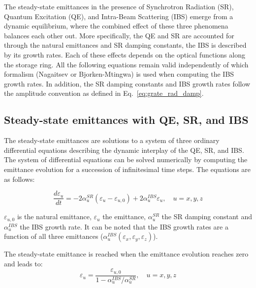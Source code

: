 The steady-state emittances in the presence of Synchrotron Radiation (SR), Quantum Excitation (QE), and Intra-Beam Scattering (IBS) emerge from a dynamic equilibrium, where the combined effect of these three phenomena balances each other out. More specifically, the QE and SR are accounted for through the natural emittances and SR damping constants, the IBS is described by its growth rates.
Each of these effects depends on the optical functions along the storage ring.
All the following equations remain valid independently of which formalism (Nagaitsev or Bjorken-Mtingwa) is used when computing the IBS growth rates. In addition, the SR damping constants and IBS growth rates follow the amplitude convention as defined in Eq.~\eqref{eq:grate_rad_damp}.

\subsection{Steady-state emittances with QE, SR, and IBS}

The steady-state emittances are solutions to a system of three ordinary differential equations describing the dynamic interplay of the QE, SR, and IBS. The system of differential equations can be solved numerically by computing the emittance evolution for a succession of infinitesimal time steps. The equations are as follows:


\begin{equation}
    \frac{d\varepsilon_u}{dt} = -2 \alpha^{SR}_u \left(\varepsilon_u - \varepsilon_{u,0} \right) + 2\alpha^{IBS}_u \varepsilon_{u}, \quad u = x,y,z
\label{eq:emit_evol}
\end{equation}

$\varepsilon_{u,0}$ is the natural emittance, $\varepsilon_u$ the emittance, $\alpha^{SR}_u$ the SR damping constant and $\alpha^{IBS}_u$ the IBS growth rate.
It can be noted that the IBS growth rates are a function of all three emittances ($\alpha^{IBS}_u(\varepsilon_{x}, \varepsilon_{y}, \varepsilon_{z})$).

The steady-state emittance is reached when the emittance evolution reaches zero and leads to:
\begin{equation}
    \varepsilon_u = \frac{\varepsilon_{u,0}}{1 - \alpha^{IBS}_u / \alpha^{SR}_u}, \quad u = x,y,z
\label{eq:emit_final}
\end{equation}

